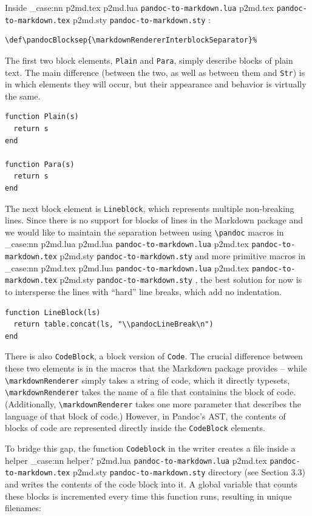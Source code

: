 \documentclass[
  digital,     %
  oneside,     %
  nosansbold,  %
  nocolorbold, %
  lof,         %
  nolot,       %
]{fithesis4}
\newcommand\macro[1]{\texttt{\textbackslash{}{#1}}}
\newcommand\pandoc[1]{\macro{pandoc\-{#1}}}
\newcommand\renderer[1]{\macro{markdown\-Renderer\-{#1}}}
\newcommand\file[1]
  {
    \str_case:nn
      { #1 }
      {
        { p2md.lua } { \texttt{pandoc\hyp{}to\hyp{}markdown.lua} }
        { p2md.tex } { \texttt{pandoc\hyp{}to\hyp{}markdown.tex} }
        { p2md.sty } { \texttt{pandoc\hyp{}to\hyp{}markdown.sty} }
      }
  }
\begin{document}
\noindent
Inside \file{p2md.tex}:

\noindent
\lstset{language=[plain]TeX}
\begin{lstlisting}
\def\pandocBlocksep{\markdownRendererInterblockSeparator}%
\end{lstlisting}

\noindent
The first two block elements, \texttt{Plain} and \texttt{Para}, simply describe blocks of plain text. The main difference (between the two, as well as between them and \texttt{Str}) is in which elements they will occur, but their appearance and behavior is virtually the same.

\noindent
\lstset{language=[5.3]Lua}
\begin{lstlisting}
function Plain(s)
  return s
end

function Para(s)
  return s
end
\end{lstlisting}

\noindent
The next block element is \texttt{Lineblock}, which represents multiple non-breaking lines. Since there is no support for blocks of lines in the Markdown package and we would like to maintain the separation between using \pandoc{...} macros in \file{p2md.lua} and more primitive macros in \file{p2md.tex}, the best solution for now is to intersperse the lines with ``hard'' line breaks, which add no indentation.

\noindent
\lstset{language=[5.3]Lua}
\begin{lstlisting}
function LineBlock(ls)
  return table.concat(ls, "\\pandocLineBreak\n")
end
\end{lstlisting}

\noindent
There is also \texttt{CodeBlock}, a block version of \texttt{Code}. The crucial difference between these two elements is in the macros that the Markdown package provides -- while \renderer{CodeSpan} simply takes a string of code, which it directly typesets, \renderer{Verbatim} takes the name of a file that containins the block of code. (Additionally, \renderer{FencedCode} takes one more parameter that describes the language of that block of code.) However, in Pandoc's AST, the contents of blocks of code are represented directly inside the \texttt{CodeBlock} elements.

To bridge this gap, the function \texttt{Codeblock} in the writer creates a file inside a helper\file{helper?} directory (see Section 3.3) and writes the contents of the code block into it. A global variable that counts these blocks is incremented every time this function runs, resulting in unique filenames:
\end{document}
